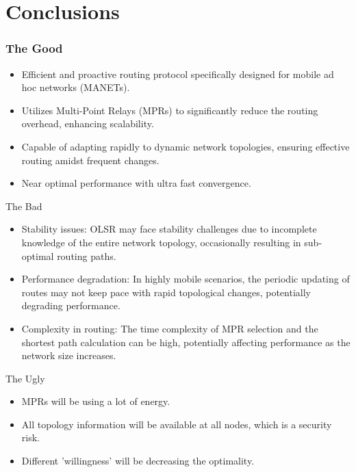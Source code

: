 \documentclass[11pt]{beamer}              %
\begin{document}
\section{Conclusions}
\begin{frame}
\frametitle{The Good}
\begin{itemize}
    \item Efficient and proactive routing protocol specifically designed for mobile ad hoc networks (MANETs).
    \item Utilizes Multi-Point Relays (MPRs) to significantly reduce the routing overhead, enhancing scalability.
    \item Capable of adapting rapidly to dynamic network topologies, ensuring effective routing amidst frequent changes.
    \item Near optimal performance with ultra fast convergence.
\end{itemize}
\end{frame}

\begin{frame}{The Bad}

\begin{itemize}
    \item Stability issues: OLSR may face stability challenges due to incomplete knowledge of the entire network topology, occasionally resulting in sub-optimal routing paths.
    \item Performance degradation: In highly mobile scenarios, the periodic updating of routes may not keep pace with rapid topological changes, potentially degrading performance.
    \item Complexity in routing: The time complexity of MPR selection and the shortest path calculation can be high, potentially affecting performance as the network size increases.
\end{itemize}
    
\end{frame}

\begin{frame}{The Ugly}

\begin{itemize}
    \item MPRs will be using a lot of energy.
    \item All topology information will be available at all nodes, which is a security risk.
    \item Different 'willingness' will be decreasing the optimality.
\end{itemize}

\end{frame}
\end{document}
